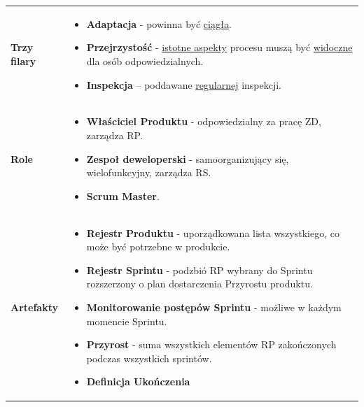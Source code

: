 \documentclass[a4paper]{article}
\begin{document}
    \begin{table}[H]
        \begin{center}
            \begin{tabular}{ p{2.5cm} p{13.5cm}}
                \textbf{Trzy filary}
                &
                \begin{itemize}
                    \item \textbf{Adaptacja} - powinna być \underline{ciągła}.
                    \item \textbf{Przejrzystość} - \underline{istotne aspekty} procesu
                    muszą być \underline{widoczne} dla osób odpowiedzialnych.
                    \item \textbf{Inspekcja} – poddawane \underline{regularnej} inspekcji.
                \end{itemize}
                \\

                \textbf{Role}
                &
                \begin{itemize}
                    \item \textbf{Właściciel Produktu} - odpowiedzialny za pracę ZD, zarządza RP.
                    \item \textbf{Zespoł deweloperski} - samoorganizujący się, wielofunkcyjny, zarządza RS.
                    \item \textbf{Scrum Master}.
                \end{itemize}
                \\


                \textbf{Artefakty}
                &
                \begin{itemize}
                    \item \textbf{Rejestr Produktu} - uporządkowana lista wszystkiego, co może być potrzebne
                    w produkcie.
                    \item \textbf{Rejestr Sprintu} - podzbió RP wybrany do Sprintu rozszerzony o plan
                    dostarczenia Przyrostu produktu.
                    \item \textbf{Monitorowanie postępów Sprintu} - możliwe w każdym momencie Sprintu.
                    \item \textbf{Przyrost} - suma wszystkich elementów RP zakończonych podczas wszystkich sprintów.
                    \item \textbf{Definicja Ukończenia}
                \end{itemize}
                \\


\end{tabular}
\end{center}
\end{table}
\end{document}
